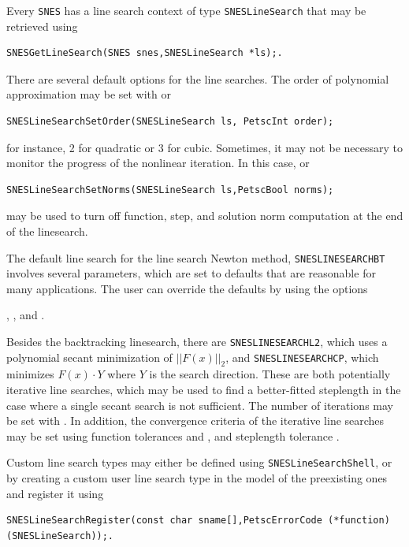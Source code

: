 Every \lstinline{SNES} has a line search context of type \lstinline{SNESLineSearch} that may be retrieved using
\begin{lstlisting}
SNESGetLineSearch(SNES snes,SNESLineSearch *ls);.
\end{lstlisting}

There are several default options for the line searches.  The order of polynomial approximation may be set
with  or
\begin{lstlisting}
SNESLineSearchSetOrder(SNESLineSearch ls, PetscInt order);
\end{lstlisting}
for instance, 2 for quadratic or 3 for cubic. Sometimes, it may not be necessary to monitor the progress of the
nonlinear iteration.  In this case,  or
\begin{lstlisting}
SNESLineSearchSetNorms(SNESLineSearch ls,PetscBool norms);
\end{lstlisting}
may be used to turn off function, step, and solution norm computation at the end of the linesearch.

The default line search for the line search Newton method, \lstinline{SNESLINESEARCHBT} involves several parameters, which are set
to defaults that are reasonable for many applications.  The user can override the defaults by using the options

, 
, and 
\break{}. 

Besides the backtracking linesearch, there are \lstinline{SNESLINESEARCHL2}, which uses a polynomial secant minimization of
$||F(x)||_2$, and \lstinline{SNESLINESEARCHCP}, which minimizes $F(x) \cdot Y$ where $Y$ is the search direction.  These are both
potentially iterative line searches, which may be used to find a better-fitted steplength in the case where a single
secant search is not sufficient.  The number of iterations may be set with .  In addition,
the convergence criteria of the iterative line searches may be set using function tolerances 
and , and steplength tolerance .

Custom line search types may either be defined using \lstinline{SNESLineSearchShell}, or by creating a custom user line search type
in the model of the preexisting ones and register it using
\begin{lstlisting}
SNESLineSearchRegister(const char sname[],PetscErrorCode (*function)(SNESLineSearch));.
\end{lstlisting}

